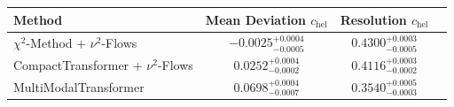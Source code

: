     \begin{tabular}{lccc}
        \toprule
        Method & Mean Deviation $c_{\text{hel}}$ & Resolution $c_{\text{hel}}$ \\
        \midrule
        $\chi^2$-Method + $\nu^2$-Flows & $-0.0025^{+0.0004}_{-0.0005}$ & $0.4300^{+0.0003}_{-0.0005}$ \\
        CompactTransformer + $\nu^2$-Flows & $0.0252^{+0.0004}_{-0.0002}$ & $0.4116^{+0.0003}_{-0.0002}$ \\
        MultiModalTransformer & $0.0698^{+0.0004}_{-0.0007}$ & $0.3540^{+0.0005}_{-0.0003}$ \\
        \bottomrule
    \end{tabular}